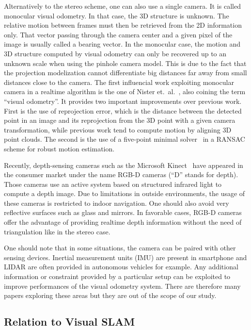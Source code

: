 Alternatively to the stereo scheme, one can also use a single camera.
It is called monocular visual odometry.
In that case, the 3D structure is unknown.
The relative motion between frames must then be retrieved
from the 2D information only.
That vector passing through the camera center and a given pixel of the image
is usually called a bearing vector.
In the monocular case, the motion and 3D structure computed by
visual odometry can only be recovered up to an unknown scale
when using the pinhole camera model.
This is due to the fact that the projection modelization cannot
differentiate big distances far away from small distances close to the camera.
The first influencial work exploiting monocular camera in a realtime algorithm
is the one of Nister et.\ al.~\cite{nister2004visual},
also coining the term ``visual odometry''.
It provides two important improvements over previous work.
First is the use of reprojection error,
which is the distance between the detected point in an image
and its reprojection from the 3D point with a given camera transformation,
while previous work tend to compute motion by aligning 3D point clouds.
The second is the use of a five-point minimal solver~\cite{nister2003efficient}
in a RANSAC scheme for robust motion estimation.

Recently, depth-sensing cameras such as the Microsoft Kinect~\cite{zhang2012microsoft}
have appeared in the consumer market under the name RGB-D cameras (``D'' stands for depth).
Those cameras use an active system based on structured infrared light
to compute a depth image.
Due to limitations in outside environments,
the usage of these cameras is restricted
to indoor navigation.
One should also avoid very reflective surfaces such as glass and mirrors.
In favorable cases, RGB-D cameras offer the advantage of providing
realtime depth information without the need of triangulation like in the stereo case.

One should note that in some situations, the camera can be paired
with other sensing devices.
Inertial measurement units (IMU) are present in smartphone
and LIDAR are often provided in autonomous vehicles for example.
Any additional information or constraint provided by a particular setup
can be exploited to improve performances of the visual odometry system.
There are therefore many papers exploring these areas but
they are out of the scope of our study.

\subsection{Relation to Visual SLAM}%
\label{sub:relation-visual-slam}

